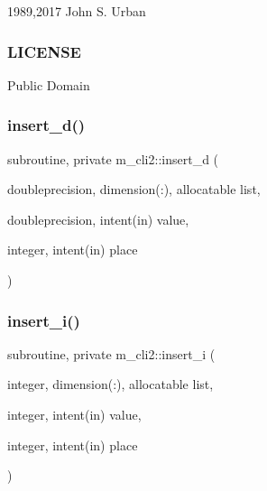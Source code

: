 1989,2017 John S. Urban \subsubsection*{L\+I\+C\+E\+N\+SE}

Public Domain \mbox{\label{namespacem__cli2_a737ae8e6f73a3fc8cc260732c047fafb}} 
\subsubsection{\texorpdfstring{insert\+\_\+d()}{insert\_d()}}
{\footnotesize\ttfamily subroutine, private m\+\_\+cli2\+::insert\+\_\+d (\begin{DoxyParamCaption}\item[{doubleprecision, dimension(\+:), allocatable}]{list,  }\item[{doubleprecision, intent(in)}]{value,  }\item[{integer, intent(in)}]{place }\end{DoxyParamCaption})\hspace{0.3cm}{\ttfamily [private]}}

\mbox{\label{namespacem__cli2_afa6f00a57f1252ba5daa0c440a23ffbb}} 
\subsubsection{\texorpdfstring{insert\+\_\+i()}{insert\_i()}}
{\footnotesize\ttfamily subroutine, private m\+\_\+cli2\+::insert\+\_\+i (\begin{DoxyParamCaption}\item[{integer, dimension(\+:), allocatable}]{list,  }\item[{integer, intent(in)}]{value,  }\item[{integer, intent(in)}]{place }\end{DoxyParamCaption})\hspace{0.3cm}{\ttfamily [private]}}

\mbox{\label{namespacem__cli2_a7e5ee66813d8f6db9d48ebdc350a6b3e}} 

